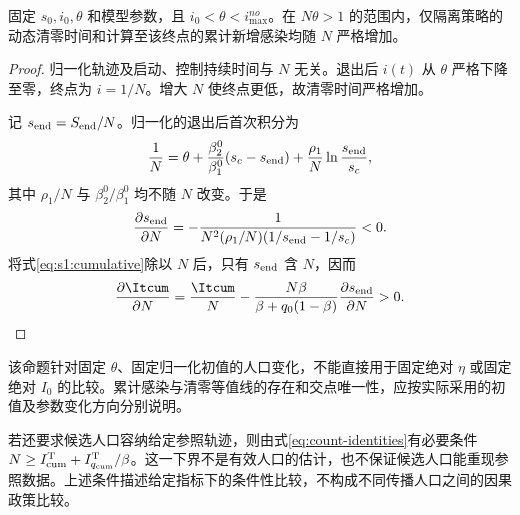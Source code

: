 \begin{proposition}
\label{prop:reference-population}
固定 $s_0,i_0,\theta$ 和模型参数，且 $i_0<\theta<i_{\max}^{no}$。在 $N\theta>1$ 的范围内，仅隔离策略的动态清零时间和计算至该终点的累计新增感染均随 $N$ 严格增加。
\end{proposition}
\begin{proof}
归一化轨迹及启动、控制持续时间与 $N$ 无关。退出后 $i(t)$ 从 $\theta$ 严格下降至零，终点为 $i=1/N$。增大 $N$ 使终点更低，故清零时间严格增加。

记 $s_{\rm end}=S_{\rm end}/N$。归一化的退出后首次积分为
\[
\frac1N=\theta+\frac{\beta_2^0}{\beta_1^0}(s_c-s_{\rm end})
+\frac{\rho_1}{N}\ln\frac{s_{\rm end}}{s_c},
\]
其中 $\rho_1/N$ 与 $\beta_2^0/\beta_1^0$ 均不随 $N$ 改变。于是
\[
\frac{\partial s_{\rm end}}{\partial N}
=-\frac1{N^2(\rho_1/N)(1/s_{\rm end}-1/s_c)}<0.
\]
将式\eqref{eq:s1:cumulative}除以 $N$ 后，只有 $s_{\rm end}$ 含 $N$，因而
\[
\frac{\partial\Itcum}{\partial N}
=\frac{\Itcum}{N}
-\frac{N\beta}{\beta+q_0(1-\beta)}\frac{\partial s_{\rm end}}{\partial N}>0.\qedhere
\]
\end{proof}
该命题针对固定 $\theta$、固定归一化初值的人口变化，不能直接用于固定绝对 $\eta$ 或固定绝对 $I_0$ 的比较。累计感染与清零等值线的存在和交点唯一性，应按实际采用的初值及参数变化方向分别说明。

若还要求候选人口容纳给定参照轨迹，则由式\eqref{eq:count-identities}有必要条件 $N\ge I^{\rm T}_{\rm cum}+I^{\rm T}_{q_{\rm cum}}/\beta$。这一下界不是有效人口的估计，也不保证候选人口能重现参照数据。上述条件描述给定指标下的条件性比较，不构成不同传播人口之间的因果政策比较。


\FloatBarrier
